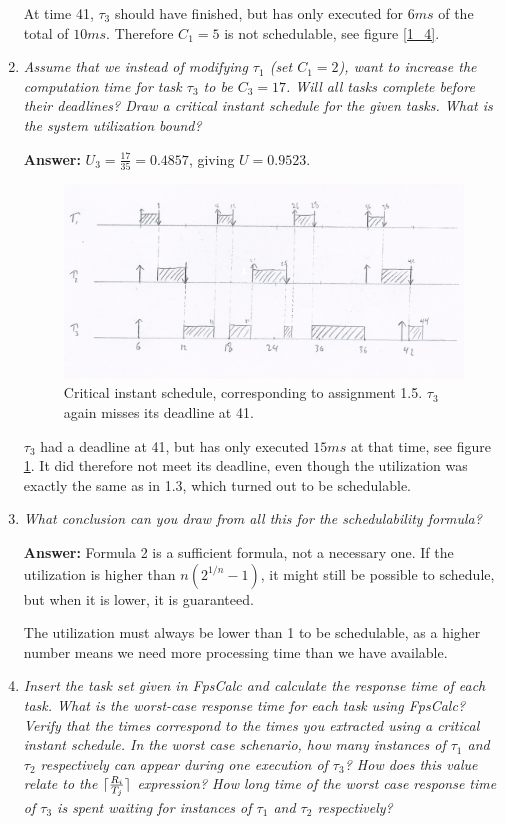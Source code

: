 \documentclass[a4paper,10pt]{article}
\DeclarePairedDelimiter{\ceil}{\lceil}{\rceil}
\newcommand{\answer}{\textbf{Answer: }}
\begin{document}
\begin{enumerate}
	At time 41, $\tau_3$ should have finished, but has only executed for $6 ms$ of the total of $10 ms$. Therefore $C_1 = 5$ is not schedulable, see figure \ref{1_4}.
	
	\item \emph{Assume that we instead of modifying $\tau_1$ (set $C_1 = 2$), want to increase the computation time for task $\tau_3$ to be $C_3 = 17$. Will all tasks complete before their deadlines? Draw a critical instant schedule for the given tasks. What is the system utilization bound?}
	
	\answer $U_3 = \frac{17}{35} = 0.4857$, giving $U = 0.9523$.
	
	\begin{figure}
	\includegraphics[scale=0.4]{1_5_low}
	\caption{Critical instant schedule, corresponding to assignment 1.5. $\tau_3$ again misses its deadline at 41.}
	\label{1_5}
	\end{figure}
	
	$\tau_3$ had a deadline at 41, but has only executed $15 ms$ at that time, see figure \ref{1_5}. It did therefore not meet its deadline, even though the utilization was exactly the same as in 1.3, which turned out to be schedulable.
	
	\item \emph{What conclusion can you draw from all this for the schedulability formula?}
	
	\answer Formula 2 is a sufficient formula, not a necessary one. If the utilization is higher than $n(2^{1/n}-1)$, it might still be possible to schedule, but when it is lower, it is guaranteed.
	
	The utilization must always be lower than 1 to be schedulable, as a higher number means we need more processing time than we have available.
	
	\item \emph{Insert the task set given in FpsCalc and calculate the response time of each task. What is the worst-case response time for each task using FpsCalc? Verify that the times correspond to the times you extracted using a critical instant schedule. In the worst case schenario, how many instances of $\tau_1$ and $\tau_2$ respectively can appear during one execution of $\tau_3$? How does this value relate to the $\ceil{\frac{R_i}{T_j}}$ expression? How long time of the worst case response time of $\tau_3$ is spent waiting for instances of $\tau_1$ and $\tau_2$ respectively?}
	

\end{enumerate}
\end{document}
